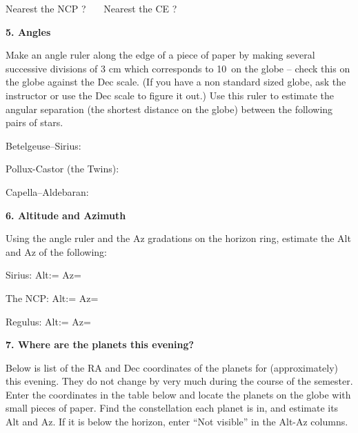 Nearest the NCP  ?\ \makebox[4cm]{\hrulefill} \ \ 
Nearest the CE   ?\ \makebox[4cm]{\hrulefill}

\bigskip\noindent
{\bf 5. Angles}

\bigskip\noindent
Make an angle ruler along the edge of a piece of paper by making several
successive divisions of 3 cm which corresponds to 10\deg\ on the globe
-- check this on the globe against the Dec scale. (If you have a non
standard sized globe, ask the instructor or use the Dec scale to figure
it out.) Use this ruler to estimate the angular separation (the
shortest distance on the globe) between the
following pairs of stars.

\bigskip
Betelgeuse--Sirius: \makebox[4cm]{\hrulefill}

Pollux-Castor (the Twins): \makebox[4cm]{\hrulefill}

Capella--Aldebaran: \makebox[4cm]{\hrulefill}
  
\bigskip
\noindent
{\bf 6. Altitude and Azimuth}

\bigskip
\noindent
Using the angle ruler and the Az gradations on the horizon ring, 
estimate the Alt and Az of the following:

\medskip   
Sirius: Alt:= \makebox[4cm]{\hrulefill} Az= \makebox[4cm]{\hrulefill}

The NCP:  Alt:= \makebox[4cm]{\hrulefill} Az= \makebox[4cm]{\hrulefill}

Regulus: Alt:= \makebox[4cm]{\hrulefill} Az= \makebox[4cm]{\hrulefill}

\bigskip

\noindent
{\bf 7. Where are the planets this evening?}

\bigskip
\noindent
Below is list of the RA and Dec coordinates of the planets for
(approximately) this evening. They do not change by very much during
the course of the semester. Enter the coordinates in the table below
and locate the planets on the globe with small pieces of paper. Find
the constellation each planet is in, and estimate its Alt and Az. If
it is below the horizon, enter ``Not visible'' in the Alt-Az columns.

